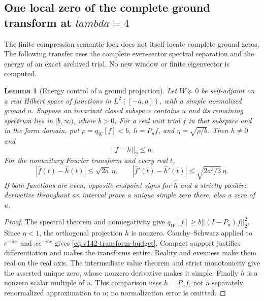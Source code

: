 \documentclass[11pt]{article}
\def\lambda{lambda}%
\def\norm#1{||#1||}%
\newtheorem{lemma}[theorem]{Lemma}
\theoremstyle{remark}
\newcommand{\norm}[1]{\left\lVert #1\right\rVert}
\begin{document}
\subsection{One local zero of the complete ground transform at \texorpdfstring{$\lambda=4$}{lambda=4}}

The finite-compression semantic lock does not itself locate complete-ground
zeros. The following transfer uses the complete even-sector spectral
separation and the energy of an exact archived trial. No new window or
finite eigenvector is computed.

\begin{lemma}[Energy control of a ground projection]
\label{lem:v142-energy-projection}
Let $W\succeq0$ be self-adjoint on a real Hilbert space of functions in
$L^2([-a,a])$, with a simple normalized ground $u$. Suppose an invariant
closed subspace contains $u$ and its remaining spectrum lies in
$[b,\infty)$, where $b>0$. For a real unit trial $f$ in that subspace and
in the form domain, put $\rho=q_W[f]<b$, $h=P_u f$, and
$\eta=\sqrt{\rho/b}$. Then $h\ne0$ and
\[
 \norm{f-h}_2\le\eta.
\]
For the nonunitary Fourier transform and every real $t$,
\begin{equation}\label{eq:v142-transform-budget}
 |\widehat f(t)-\widehat h(t)|\le\sqrt{2a}\,\eta,
 \qquad
 |\widehat f'(t)-\widehat h'(t)|\le\sqrt{2a^3/3}\,\eta.
\end{equation}
If both functions are even, opposite endpoint signs for $\widehat h$
and a strictly positive derivative throughout an interval prove a
unique simple zero there, also a zero of $\widehat u$.
\end{lemma}
\begin{proof}
The spectral theorem and nonnegativity give
$q_W[f]\ge b\norm{(I-P_u)f}_2^2$. Since $\eta<1$, the orthogonal
projection $h$ is nonzero. Cauchy--Schwarz applied to $e^{-itx}$ and
$xe^{-itx}$ gives \eqref{eq:v142-transform-budget}. Compact support
justifies differentiation and makes the transforms entire. Reality
and evenness make them real on the real axis. The intermediate value
theorem and strict monotonicity give the asserted unique zero, whose
nonzero derivative makes it simple. Finally $h$ is a nonzero scalar
multiple of $u$. This comparison uses $h=P_u f$, not a separately
renormalized approximation to $u$; no normalization error is omitted.
\end{proof}
\end{document}
